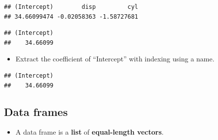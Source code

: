 \documentclass[]{book}
\newenvironment{Shaded}{\begin{snugshade}}{\end{snugshade}}
\newcommand{\CommentTok}[1]{\textcolor[rgb]{0.56,0.35,0.01}{\textit{#1}}}
\newcommand{\DecValTok}[1]{\textcolor[rgb]{0.00,0.00,0.81}{#1}}
\newcommand{\NormalTok}[1]{#1}
\newcommand{\OperatorTok}[1]{\textcolor[rgb]{0.81,0.36,0.00}{\textbf{#1}}}
\newcommand{\StringTok}[1]{\textcolor[rgb]{0.31,0.60,0.02}{#1}}
\providecommand{\tightlist}{%
  \setlength{\itemsep}{0pt}\setlength{\parskip}{0pt}}
\begin{document}
\begin{Shaded}
\end{Shaded}

\begin{verbatim}
## (Intercept)        disp         cyl 
## 34.66099474 -0.02058363 -1.58727681
\end{verbatim}

\begin{Shaded}
\end{Shaded}

\begin{verbatim}
## (Intercept) 
##    34.66099
\end{verbatim}

\begin{itemize}
\tightlist
\item
  Extract the coefficient of ``Intercept'' with indexing using a name.
\end{itemize}

\begin{Shaded}
\end{Shaded}

\begin{verbatim}
## (Intercept) 
##    34.66099
\end{verbatim}

\hypertarget{data-frames}{%
\subsection{Data frames}\label{data-frames}}

\begin{itemize}
\tightlist
\item
  A data frame is a \textbf{list} of \textbf{equal-length vectors}.
\end{itemize}
\end{document}
